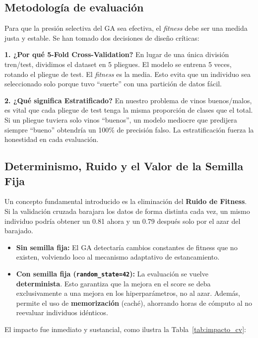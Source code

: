 \documentclass[12pt, a4paper]{article}
\begin{document}
\subsection{Metodología de evaluación}

Para que la presión selectiva del GA sea efectiva, el \textit{fitness} debe ser una
medida justa y estable. Se han tomado dos decisiones de diseño críticas:

\textbf{1. ¿Por qué 5-Fold Cross-Validation?}
En lugar de una única división tren/test, dividimos el dataset en 5 pliegues. El modelo
se entrena 5 veces, rotando el pliegue de test. El \textit{fitness} es la media. Esto
evita que un individuo sea seleccionado solo porque tuvo ``suerte'' con una partición de
datos fácil.

\textbf{2. ¿Qué significa Estratificado?}
En nuestro problema de vinos buenos/malos, es vital que cada pliegue de test tenga la
misma proporción de clases que el total. Si un pliegue tuviera solo vinos ``buenos'', un
modelo mediocre que predijera siempre ``bueno'' obtendría un 100\% de precisión falso.
La estratificación fuerza la honestidad en cada evaluación.

\subsection{Determinismo, Ruido y el Valor de la Semilla Fija}

Un concepto fundamental introducido es la eliminación del \textbf{Ruido de Fitness}. Si
la validación cruzada barajara los datos de forma distinta cada vez, un mismo individuo
podría obtener un 0.81 ahora y un 0.79 después solo por el azar del barajado.
\begin{itemize}[itemsep=0.2em]
  \item \textbf{Sin semilla fija:} El GA detectaría cambios constantes de fitness que no
        existen, volviendo loco al mecanismo adaptativo de estancamiento.
  \item \textbf{Con semilla fija (\texttt{random\_state=42}):} La evaluación se vuelve
        \textbf{determinista}. Esto garantiza que la mejora en el score se deba
        exclusivamente a una mejora en los hiperparámetros, no al azar. Además, permite el
        uso de \textbf{memorización} (caché), ahorrando horas de cómputo al no reevaluar
        individuos idénticos.
\end{itemize}

El impacto fue inmediato y sustancial, como ilustra la Tabla~\ref{tab:impacto_cv}:
\end{document}
